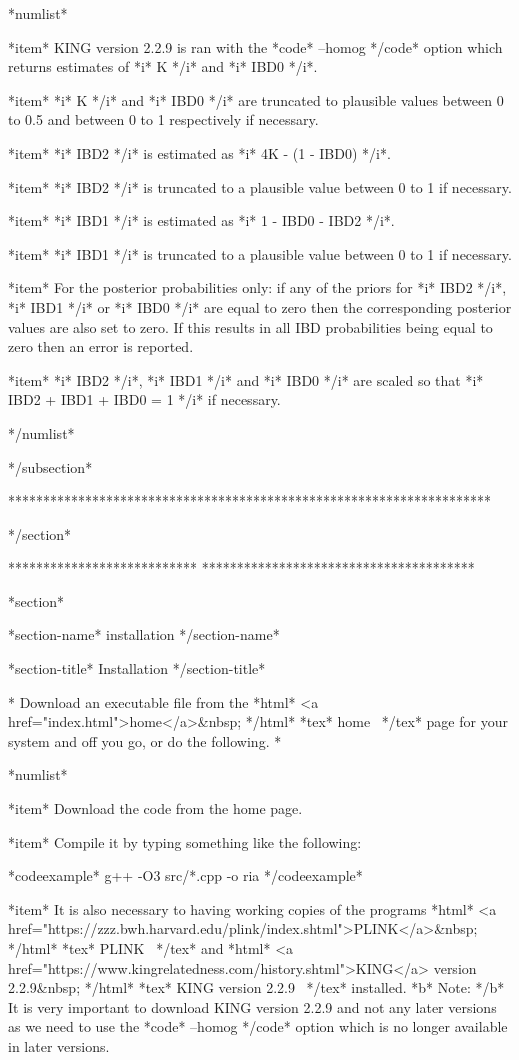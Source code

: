 *numlist*

*item*
KING version 2.2.9 is ran with the *code* --homog */code* option which returns estimates of *i* K */i* and *i* IBD0 */i*.

*item*
*i* K */i* and *i* IBD0 */i* are truncated to plausible values between 0 to 0.5 and between 0 to 1 respectively if necessary.

*item*
*i* IBD2 */i* is estimated as *i* 4K - (1 - IBD0) */i*.

*item*
*i* IBD2 */i* is truncated to a plausible value between 0 to 1 if necessary.

*item*
*i* IBD1 */i* is estimated as *i* 1 - IBD0 - IBD2 */i*.

*item*
*i* IBD1 */i* is truncated to a plausible value between 0 to 1 if necessary.

*item*
For the posterior probabilities only: if any of the priors for *i* IBD2 */i*, *i* IBD1 */i* or *i* IBD0 */i* are equal to zero then the corresponding posterior values are also set to zero. If this results in all IBD probabilities being equal to zero then an error is reported.

*item*
*i* IBD2 */i*, *i* IBD1 */i* and *i* IBD0 */i* are scaled so that *i* IBD2 + IBD1 + IBD0 = 1 */i* if necessary.


*/numlist*

*/subsection*

*********************************************************************

*/section*

***************************
***************************************

*section*

*section-name* installation */section-name*

*section-title* Installation */section-title*

*
Download an executable file from the *html* <a href="index.html">home</a>&nbsp; */html* *tex* home~ */tex* page for your system and off you go, or do the following.
*

*numlist*

*item* Download the code from the home page.

*item* Compile it by typing something like the following:

*codeexample*
g++ -O3 src/*.cpp -o ria
*/codeexample*

*item* It is also necessary to having working copies of the programs *html* <a href="https://zzz.bwh.harvard.edu/plink/index.shtml">PLINK</a>&nbsp; */html* *tex* PLINK~ */tex* and *html* <a href="https://www.kingrelatedness.com/history.shtml">KING</a> version 2.2.9&nbsp; */html* *tex* KING version 2.2.9~ */tex* installed. *b* Note: */b* It is very important to download KING version 2.2.9 and not any later versions as we need to use the *code* --homog */code* option which is no longer available in later versions.

